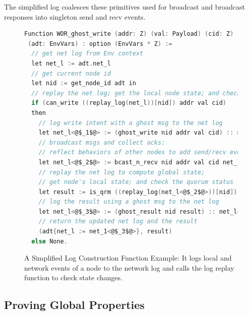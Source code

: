 The simplified log coalesces these primitives used for broadcast and broadcast responses into singleton send and recv events.

\begin{figure}

\begin{lstlisting}[language=C]
Function WOR_ghost_write (addr: Z) (val: Payload) (cid: Z)
 (adt: EnvVars) : option (EnvVars * Z) :=
  // get net log from Env context
  let net_l := adt.net_l
  // get current node id 
  let nid := get_node_id adt in 
  // replay the net log; get the local node state; and check if the node is in a writable status 
  if (can_write ((replay_log(net_l))[nid]) addr val cid)
  then
    // log write intent with a ghost msg to the net log 
    let net_l<@$_1$@> := (ghost_write nid addr val cid) :: net_l in
    // broadcast msgs and collect acks: 
    // reflect behaviors of other nodes to add send/recv events by this and other nodes to the net log 
    let net_l<@$_2$@> := bcast_n_recv nid addr val cid net_l<@$_1$@> adt in
    // replay the net log to compute global state; 
    // get node's local state; and check the quorum status 
    let result := is_qrm ((replay_log(net_l<@$_2$@>))[nid]) addr in
    // log the result using a ghost msg to the net log
    let net_l<@$_3$@> := (ghost_result nid result) :: net_l<@$_2$@> in
    // return the updated net log and the result 
    (adt{net_l := net_1<@$_3$@>}, result)
  else None.
\end{lstlisting}

\caption{A Simplified Log Construction Function Example: It logs local and network events of a node to the network log and calls the log replay function to check state changes.}
\label{fig:spec}
\end{figure}

\subsection{Proving Global Properties}
\label{subsec:safety_verification}

